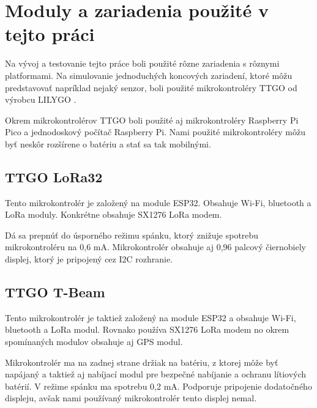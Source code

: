 \documentclass[slovak,master]{diploma}
\begin{document}
\section{Moduly a zariadenia použité v tejto práci}
Na vývoj a testovanie tejto práce boli použité rôzne zariadenia s rôznymi platformami. Na simulovanie jednoduchých koncových zariadení, 
ktoré môžu predstavovať napríklad nejaký senzor, boli použité mikrokontroléry TTGO od výrobcu LILYGO \cite{lilygo}.

Okrem mikrokontrolérov TTGO boli použité aj mikrokontroléry Raspberry Pi Pico a jednodoskový počítač Raspberry Pi.
Nami použité mikrokontroléry môžu byť neskôr rozšírene o batériu a stať sa tak mobilnými.

\subsection{TTGO LoRa32}
Tento mikrokontrolér je založený na module ESP32. Obsahuje Wi-Fi, bluetooth a LoRa moduly. 
Konkrétne obsahuje SX1276 LoRa modem.

Dá sa prepnúť do úsporného režimu spánku, ktorý znižuje spotrebu mikrokontroléru na 0,6 mA.
Mikrokontrolér obsahuje aj 0,96 palcový čiernobiely displej, ktorý je pripojený cez I2C rozhranie.

\subsection{TTGO T-Beam}
Tento mikrokontrolér je taktiež založený na module ESP32 a obsahuje Wi-Fi, bluetooth a LoRa modul.
Rovnako používa SX1276 LoRa modem no okrem spomínaných modulov obsahuje aj GPS modul.

Mikrokontrolér ma na zadnej strane držiak na batériu, z ktorej môže byť napájaný a taktiež aj nabíjací modul 
pre bezpečné nabíjanie a ochranu lítiových batérií.
V režime spánku ma spotrebu 0,2 mA. Podporuje pripojenie dodatočného displeju, avšak nami používaný mikrokontrolér tento displej nemal.
\end{document}
